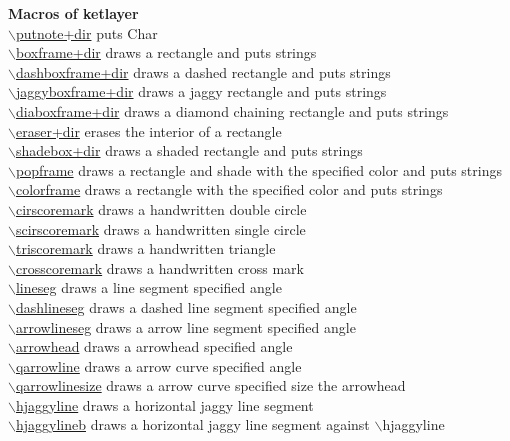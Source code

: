 \documentclass[papersize,a4paper,12pt]{article}
\newcommand{\bs}{$\backslash$}
\begin{document}
\begin{tabbing}
{\bf Macros of ketlayer} \> \\
\hyperlink{putnote}{\bs putnote+dir} \> puts Char\\
\hyperlink{boxframe}{\bs boxframe+dir} \> draws a rectangle and puts strings\\
\hyperlink{dashboxframe}{\bs dashboxframe+dir} \> draws a dashed rectangle and puts strings\\
\hyperlink{jaggyboxframe}{\bs jaggyboxframe+dir} \> draws a jaggy rectangle and puts strings\\
\hyperlink{diaboxframe}{\bs diaboxframe+dir} \> draws a diamond chaining rectangle and puts strings\\
\hyperlink{eraser}{\bs eraser+dir} \> erases the interior of a rectangle\\
\hyperlink{shadebox}{\bs shadebox+dir} \> draws a shaded rectangle and puts strings\\
\hyperlink{popframe}{\bs popframe} \> draws a rectangle and shade with the specified color and puts strings\\
\hyperlink{colorframe}{\bs colorframe} \> draws a rectangle with the specified color and puts strings\\
\hyperlink{cirscoremark}{\bs cirscoremark} \> draws a handwritten double circle\\
\hyperlink{scirscoremark}{\bs scirscoremark} \> draws a handwritten single circle\\
\hyperlink{triscoremark}{\bs triscoremark} \> draws a handwritten triangle\\
\hyperlink{crosscoremark}{\bs crosscoremark} \> draws a handwritten cross mark\\
\hyperlink{lineseg}{\bs lineseg} \> draws a line segment specified angle\\
\hyperlink{lineseg}{\bs dashlineseg} \> draws a dashed line segment specified angle\\
\hyperlink{arrowlineseg}{\bs arrowlineseg} \> draws a arrow line segment specified angle\\
\hyperlink{arrowhead}{\bs arrowhead} \> draws a arrowhead specified angle\\
\hyperlink{qarrowline}{\bs qarrowline} \> draws a arrow curve specified angle\\
\hyperlink{qarrowline}{\bs qarrowlinesize} \> draws a arrow curve specified size the arrowhead\\
\hyperlink{hjaggyline}{\bs hjaggyline} \> draws a horizontal jaggy line segment\\
\hyperlink{hjaggylineb}{\bs hjaggylineb} \> draws a horizontal jaggy line segment against \bs hjaggyline\\

\end{tabbing}
\end{document}
